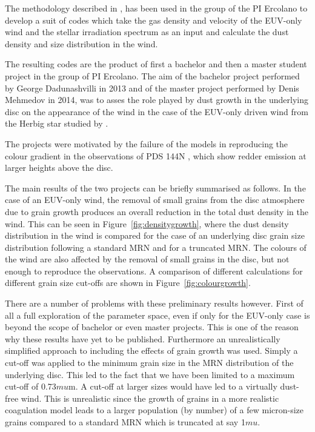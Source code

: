 \documentclass[10pt,fleqn,twoside]{article}
\begin{document}
The methodology described in \citet{2011MNRAS.411.1104O}, has been
used in the group of the PI Ercolano to develop a suit of codes which
take the gas density and velocity of the EUV-only wind and the stellar
irradiation spectrum as an input and calculate the dust density and
size distribution in the wind. 

The resulting codes are the product of first a bachelor and then a master
student project in the group of PI Ercolano. The aim of the bachelor project
performed by George Dadunashvilli in 2013 and of the master project
performed  by Denis Mehmedov in 2014, was to asses the role played by
dust growth in the underlying disc on the appearance of the wind in
the case of the EUV-only driven wind from the Herbig star studied by
\citet{2011MNRAS.411.1104O}. 

The projects were motivated by the failure of the \citet{2011MNRAS.411.1104O} 
models in reproducing the colour gradient in the observations
of PDS 144N \citep[e.g.,][]{2006ApJ...645.1272P}, which show redder emission at
larger heights above the disc. 

The main results of the two projects can be briefly summarised as follows. 
In the case of an EUV-only wind, the removal of small grains from the disc atmosphere due to grain
growth produces an overall reduction in the total dust density in the
wind. This can be seen in Figure~\ref{fig:densitygrowth}, where the
dust density distribution in the wind is compared for the case of an
underlying disc grain size distribution following a 
standard MRN \citep{1977ApJ...217..425M} and for a truncated 
MRN. The colours of the wind are also affected by the removal of small
grains in the disc, but not enough to reproduce the observations. A
comparison of different calculations for different grain size cut-offs
are shown in Figure~\ref{fig:colourgrowth}. 

There are a number of problems with these preliminary results
however. First of all
a full exploration of the parameter space, even if only for the
EUV-only case is beyond the scope of bachelor or even master
projects. This is one of the reason why these results have yet to be 
published. Furthermore an unrealistically simplified approach to 
including the effects of grain growth was used. Simply a cut-off was
applied to the minimum grain size in the MRN distribution of the
underlying disc. This led to the fact that we have been limited to a
maximum cut-off of 0.73$mu$m. A cut-off at larger sizes would have led
to a virtually dust-free wind. This is unrealistic since the growth of
grains in a more realistic coagulation model leads to a larger population (by
number) of a few micron-size grains compared to a standard MRN which
is truncated at say 1$mu$. 
\end{document}
